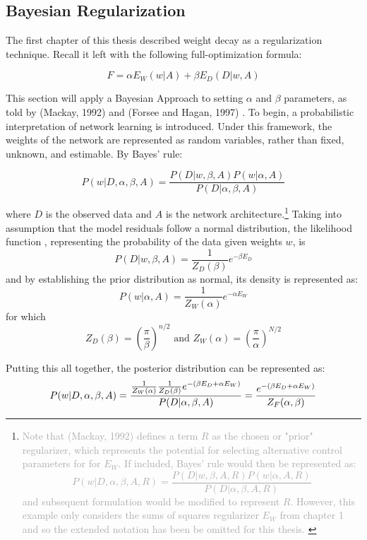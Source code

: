 \subsection{Bayesian Regularization}


The first chapter of this thesis described weight decay as a regularization technique.  Recall it left with the following full-optimization formula:

$$
F = \alpha E_W(w|A) + \beta E_D(D|w,A)
$$



This section will apply a Bayesian Approach to setting $\alpha$ and $\beta$ parameters, as told by (Mackay, 1992) \cite{mackay1992practical} and (Forsee and Hagan, 1997) \cite{foresee1997gauss}.  To begin, a probabilistic interpretation of network learning \cite{mackay1992practical} is introduced.  Under this framework, the weights of the network are represented as random variables, rather than fixed, unknown, and estimable.  By Bayes' rule:
 
$$
P(w|D,\alpha,\beta,A) = \frac{P(D|w,\beta,A) P(w|\alpha,A)}{P(D|\alpha,\beta,A)}
$$

where $D$ is the observed data and $A$ is the network architecture.\footnote{
\textcolor{darkgray}{
Note that (Mackay, 1992) defines a term $R$ as the chosen or "prior" regularizer, which represents the potential for selecting alternative control parameters for for $E_W$.  If included, Bayes' rule would then be represented  as:
$$
P(w|D,\alpha,\beta,A,R) = \frac{P(D|w,\beta,A,R) P(w|\alpha,A,R)}{P(D|\alpha,\beta,A,R)}
$$
 and subsequent formulation would be modified to represent $R$. However, this example only considers the sums of squares regularizer $E_W$ from chapter 1 and so the extended notation has been be omitted for this thesis.
 }}
Taking into assumption that the model residuals follow a normal distribution, the likelihood function \cite{foresee1997gauss}, representing the probability of the data given weights $w$, is
$$
P(D|w,\beta,A) = \frac{1}{Z_D(\beta)} e^{-\beta E_D}
$$
and by establishing the prior distribution as normal, its density is represented as:
$$
P(w|\alpha,A) = \frac{1}{Z_W(\alpha)} e^{-\alpha E_W}
$$
for which
$$
Z_D(\beta) = \left( \frac{\pi}{\beta} \right) ^{n/2} \text{ and }
Z_W(\alpha) = \left( \frac{\pi}{\alpha} \right) ^{N/2}
$$

Putting this all together, the posterior distribution can be represented as:
$$
P(w|D,\alpha,\beta,A) = \frac{\frac{1}{Z_W(\alpha)} \frac{1}{Z_D(\beta)} e^{-(\beta E_D + \alpha E_W)}}{P(D|\alpha,\beta,A)} \\
= \frac{e^{-(\beta E_D + \alpha E_W)}}{Z_F(\alpha,\beta)}
$$

